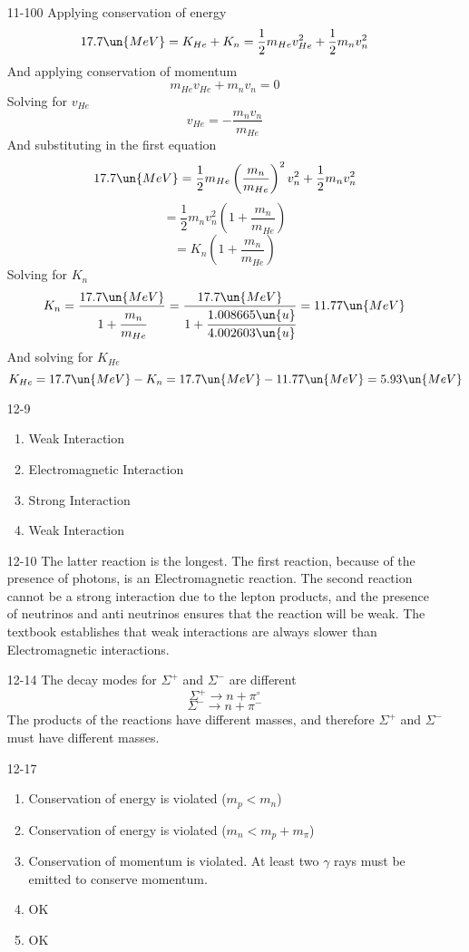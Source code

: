 \documentclass{2620hw}
\begin{document}
\maketitle

\begin{enumerate}

\item [11-100] Applying conservation of energy
\[
	17.7 \un{MeV} = K_{He} + K_n = \frac{1}{2}m_{He}v_{He}^2 + \frac{1}{2}m_{n}v_{n}^2
\]
And applying conservation of momentum
\[
	m_{He}v_{He} + 	m_{n}v_{n} = 0
\]
Solving for $v_{He}$
\[
	v_{He} = -\frac{m_nv_n}{m_{He}}
\]
And substituting in the first equation
\[
	17.7\un{MeV} = \frac{1}{2}m_{He} \left( \frac{m_n}{m_{He}}\right)^2 v_n^2 + \frac{1}{2}m_{n}v_{n}^2
\]
\[
	= \frac{1}{2}m_{n}v_n^2 \left(1 +  \frac{m_n}{m_{He}} \right)
\]
\[
	= K_n \left(1 +  \frac{m_n}{m_{He}} \right)
\]
Solving for $K_n$
\[
	K_n = \frac{17.7\un{MeV}}{1+ \cfrac{m_n}{m_{He}}} = \frac{17.7\un{MeV}}{1+ \cfrac{1.008665\un{u}}{4.002603\un{u}}} = 11.77 \un{MeV}
\]
And solving for $K_{He}$
\[
	K_{He} = 17.7\un{MeV} - K_n = 17.7\un{MeV} - 11.77\un{MeV} =  5.93\un{MeV}
\]
\newpage

\item [12-9]
\begin{enumerate}
	\item Weak Interaction
	\item Electromagnetic Interaction
	\item Strong Interaction
	\item Weak Interaction
\end{enumerate}

\item [12-10] The latter reaction is the longest. The first reaction, because of the presence of photons, is an Electromagnetic reaction. The second reaction cannot be a strong interaction due to the lepton products, and the presence of neutrinos and anti neutrinos ensures that the reaction will be weak. The textbook establishes that weak interactions are always slower than Electromagnetic interactions.

\item [12-14] The decay modes for $\Sigma^+$ and $\Sigma^-$ are different
\[
	\Sigma^+ \rightarrow n + \pi^{\circ}
\]
\[
	\Sigma^- \rightarrow n + \pi^{-}
\]
The products of the reactions have different masses, and therefore $\Sigma^+$ and $\Sigma^-$ must have different masses.

\item [12-17]
\begin{enumerate}
	\item Conservation of energy is violated ($m_p < m_n$)
	\item Conservation of energy is violated ($m_n < m_p + m_{\pi}$)
	\item Conservation of momentum is violated. At least two $\gamma$ rays must be emitted to conserve momentum.
	\item OK
	\item OK
\end{enumerate}


\end{enumerate}
\end{document}
